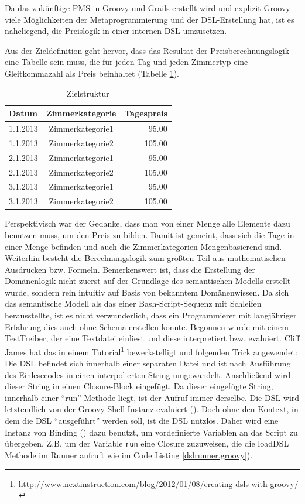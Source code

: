 \documentclass[11pt,english,ngerman, headsepline]{scrreprt}
\begin{document}
Da das zukünftige PMS in Groovy und Grails erstellt wird und explizit Groovy viele
Möglichkeiten der Metaprogrammierung und der DSL-Erstellung hat, ist es
naheliegend, die Preislogik in einer internen DSL umzusetzen. 

Aus der Zieldefinition geht hervor, dass das Resultat der Preisberechnungslogik
eine Tabelle sein muss, die für jeden Tag und jeden Zimmertyp eine Gleitkommazahl als
Preis beinhaltet (Tabelle \ref{zielDefinition}).  

\begin{table}[htpb]
  \centering
  \begin{tabular}{| l | c | r |} 
 	\hline 
  	Datum & Zimmerkategorie & Tagespreis \\
  	\hline 
	1.1.2013 &  Zimmerkategorie1 &  95.00 \\
	1.1.2013 &  Zimmerkategorie2 &  105.00 \\
	2.1.2013 &  Zimmerkategorie1 &  95.00 \\
	2.1.2013 &  Zimmerkategorie2 &  105.00 \\
	3.1.2013 &  Zimmerkategorie1 &  95.00 \\
	3.1.2013 &  Zimmerkategorie2 &  105.00 \\
	\hline 
  	\end{tabular}  
 	\caption{Zielstruktur}
  \label{zielDefinition}
\end{table}	 

Perspektivisch war der Gedanke, dass man von einer Menge alle Elemente dazu
benutzen muss, um den Preis zu bilden. Damit ist gemeint, dass sich die Tage in
einer Menge befinden und auch die Zimmerkategorien Mengenbasierend sind.
Weiterhin besteht die Berechnungslogik zum größten Teil aus mathematischen
Ausdrücken bzw. Formeln.
Bemerkenswert ist, dass die Erstellung der Domänenlogik nicht zuerst auf der
Grundlage des semantischen Modells erstellt wurde, sondern rein intuitiv auf
Basis von bekanntem Domänenwissen. Da sich das semantische Modell als das einer
Bash-Script-Sequenz mit Schleifen herausstellte, ist es nicht verwunderlich,
dass ein Programmierer mit langjähriger Erfahrung dies auch ohne Schema erstellen
konnte.
Begonnen wurde mit einem TestTreiber, der eine Textdatei einliest und diese
interpretiert bzw. evaluiert.
Cliff James hat das in einem
Tutorial\footnote{http://www.nextinstruction.com/blog/2012/01/08/creating-dsls-with-groovy/}
bewerkstelligt und folgenden Trick angewendet:
Die DSL befindet sich innerhalb einer separaten Datei und ist nach Ausführung
des Einlesecodes in einen interpolierten String umgewandelt. Anschließend wird
dieser String in einen Closure-Block eingefügt.
Da dieser eingefügte String, innerhalb einer ``run'' Methode liegt, ist der
Aufruf immer derselbe.
Die DSL wird letztendlich von der Groovy Shell Instanz evaluiert (\cite[S.
368]{koenig2007groovy}).
Doch ohne den Kontext, in dem die DSL ``ausgeführt'' werden soll, ist die DSL
nutzlos. Daher wird eine Instanz von Binding (\cite[S. 368]{koenig2007groovy})
dazu benutzt, um vordefinierte Variablen an das Script zu übergeben.
Z.B. um der Variable \texttt{run} eine Closure
zuzuweisen, die die loadDSL Methode im Runner aufruft wie im Code Listing
\ref{dslrunner.groovy}).
 
\end{document}
